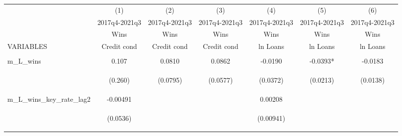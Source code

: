 \documentclass[]{article}
\begin{document}
\begin{center}
\begin{tabular}{lcccccc} \hline
 & (1) & (2) & (3) & (4) & (5) & (6) \\
 & 2017q4-2021q3 & 2017q4-2021q3 & 2017q4-2021q3 & 2017q4-2021q3 & 2017q4-2021q3 & 2017q4-2021q3 \\
 & Wins & Wins & Wins & Wins & Wins & Wins \\
VARIABLES & Credit cond & Credit cond & Credit cond & ln Loans & ln Loans & ln Loans \\ \hline
\vspace{4pt} & \begin{footnotesize}\end{footnotesize} & \begin{footnotesize}\end{footnotesize} & \begin{footnotesize}\end{footnotesize} & \begin{footnotesize}\end{footnotesize} & \begin{footnotesize}\end{footnotesize} & \begin{footnotesize}\end{footnotesize} \\
m\_L\_wins & 0.107 & 0.0810 & 0.0862 & -0.0190 & -0.0393* & -0.0183 \\
\vspace{4pt} & \begin{footnotesize}(0.260)\end{footnotesize} & \begin{footnotesize}(0.0795)\end{footnotesize} & \begin{footnotesize}(0.0577)\end{footnotesize} & \begin{footnotesize}(0.0372)\end{footnotesize} & \begin{footnotesize}(0.0213)\end{footnotesize} & \begin{footnotesize}(0.0138)\end{footnotesize} \\
m\_L\_wins\_key\_rate\_lag2 & -0.00491 &  &  & 0.00208 &  &  \\
\vspace{4pt} & \begin{footnotesize}(0.0536)\end{footnotesize} & \begin{footnotesize}\end{footnotesize} & \begin{footnotesize}\end{footnotesize} & \begin{footnotesize}(0.00941)\end{footnotesize} & \begin{footnotesize}\end{footnotesize} & \begin{footnotesize}\end{footnotesize} \\

\end{tabular}
\end{center}
\end{document}
